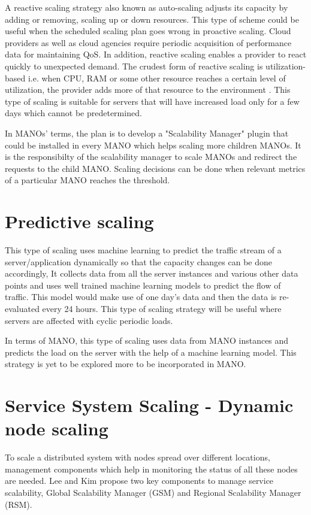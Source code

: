 A reactive scaling strategy also known as auto-scaling adjusts its capacity by adding or removing, scaling up or down resources.
This type of scheme could be useful when the scheduled scaling plan goes wrong in proactive scaling. Cloud providers as well as cloud agencies require periodic acquisition of performance data for maintaining QoS. In addition, reactive scaling enables a provider to react quickly to unexpected demand. The crudest form of reactive scaling is utilization-based i.e. when  CPU, RAM  or some other resource reaches a certain level of  utilization, the provider adds  more of that resource to the environment \cite{falatah_cloud_2014} \cite{reese_cloud_nodate}. This type of scaling is suitable for servers that will have increased load only for a few days which cannot be predetermined.

In MANOs' terms, the plan is to develop a "Scalability Manager" plugin that could be installed in every MANO which helps scaling more children MANOs. It is the responsibilty of the scalability manager to scale MANOs and redirect the requests to the child MANO. Scaling decisions can be done when relevant metrics of a particular MANO reaches the threshold.


\section{Predictive scaling}
This type of scaling uses machine learning to predict the traffic stream of a server/application dynamically so that the capacity changes can be done accordingly, It collects data from all the server instances and various other data points and uses well trained machine learning models to predict the flow of traffic. This model would make use of one day's data and then the data is re-evaluated every 24 hours. This type of scaling strategy will be useful where servers are affected with cyclic periodic loads.

In terms of MANO, this type of scaling uses data from MANO instances and predicts the load on the server with the help of a machine learning model. This strategy is yet to be explored more to be incorporated in MANO.


\section{Service System Scaling - Dynamic node scaling}

To scale a distributed system with nodes spread over different locations, management components which help in monitoring the status of all these nodes are needed. Lee and Kim \cite{lee_software_2010} propose two key components to manage service scalability, Global Scalability Manager (GSM) and Regional Scalability Manager (RSM).


